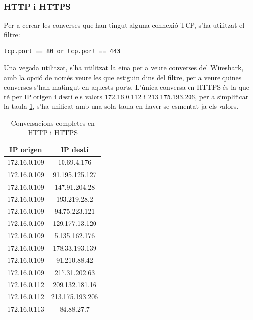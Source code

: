 \documentclass{article}
\begin{document}
\subsubsection{HTTP i HTTPS}
Per a cercar les converses que han tingut alguna connexió TCP, s'ha utilitzat
el filtre:
\begin{verbatim}
tcp.port == 80 or tcp.port == 443
\end{verbatim}
Una vegada utilitzat, s'ha utilitzat la eina per a veure converses del
Wireshark, amb la opció de només veure les que estiguin dins del filtre,
per a veure quines converses s'han matingut en aquests ports. L'única conversa
en HTTPS és la que té per IP origen i destí els valors 172.16.0.112 i 
213.175.193.206, per a simplificar la taula 
\ref{tcp:http}, s'ha unificat amb una sola taula
en haver-se esmentat ja els valors.
\begin{table}[!h]
\centering
\begin{tabular}{cc}
IP origen &IP destí\\
\hline
172.16.0.109 &10.69.4.176\\
172.16.0.109 &91.195.125.127\\
172.16.0.109 &147.91.204.28\\
172.16.0.109 &193.219.28.2\\
172.16.0.109 &94.75.223.121\\
172.16.0.109 &129.177.13.120\\
172.16.0.109 &5.135.162.176\\
172.16.0.109 &178.33.193.139\\
172.16.0.109 &91.210.88.42\\
172.16.0.109 &217.31.202.63\\
172.16.0.112 &209.132.181.16\\
172.16.0.112 &213.175.193.206\\
172.16.0.113 &84.88.27.7\\
\end{tabular}
\caption{Conversacions completes en HTTP i HTTPS}
\label{tcp:http}
\end{table}
\end{document}
